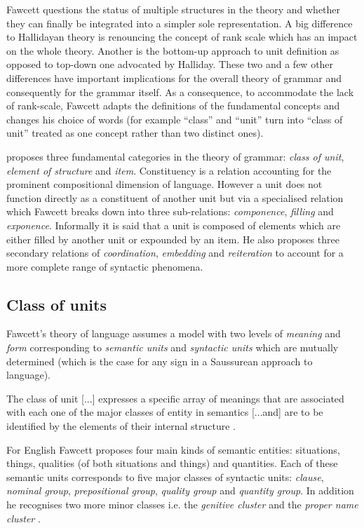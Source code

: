 Fawcett questions the status of multiple structures in the theory and whether they can finally be integrated into a simpler sole representation. A big difference to Hallidayan theory is renouncing the concept of rank scale which has an impact on the whole theory. Another is the bottom-up approach to unit definition as opposed to top-down one advocated by Halliday. These two and a few other differences have important implications for the overall theory of grammar and consequently for the grammar itself. As a consequence, to accommodate the lack of rank-scale, Fawcett adapts the definitions of the fundamental concepts and changes his choice of words (for example ``class'' and ``unit'' turn into ``class of unit'' treated as one concept rather than two distinct ones).

\citet{Fawcett2000} proposes three fundamental categories in the theory of grammar: \textit{class of unit}, \textit{element of structure} and \textit{item}. Constituency is a relation accounting for the prominent compositional dimension of language. However a unit does not function directly as a constituent of another unit but via a specialised relation which Fawcett breaks down into three sub-relations: \textit{componence}, \textit{filling} and \textit{exponence}. Informally it is said that a unit is composed of elements which are either filled by another unit or expounded by an item. He also proposes three secondary relations of \textit{coordination}, \textit{embedding} and \textit{reiteration} to account for a more complete range of syntactic phenomena.

\subsection{Class of units}
Fawcett's theory of language assumes a model with two levels of \textit{meaning} and \textit{form} corresponding to \textit{semantic units} and \textit{syntactic units} which are mutually determined (which is the case for any sign in a Saussurean approach to language). 

\begin{definition}\label{def:class2}
	The class of unit [...] expresses a specific array of meanings that are associated with each one of the major classes of entity in semantics [...and] are to be identified by the elements of their internal structure \citep[195]{Fawcett2000}. 
\end{definition}

For English Fawcett proposes four main kinds of semantic entities: situations, things, qualities (of both situations and things) and quantities. Each of these semantic units corresponds to five major classes of syntactic units: \textit{clause}, \textit{nominal group}, \textit{prepositional group}, \textit{quality group} and \textit{quantity group}. In addition he recognises two more minor classes i.e. the \textit{genitive cluster} and the \textit{proper name cluster} \citep[193--194]{Fawcett2000}. 

